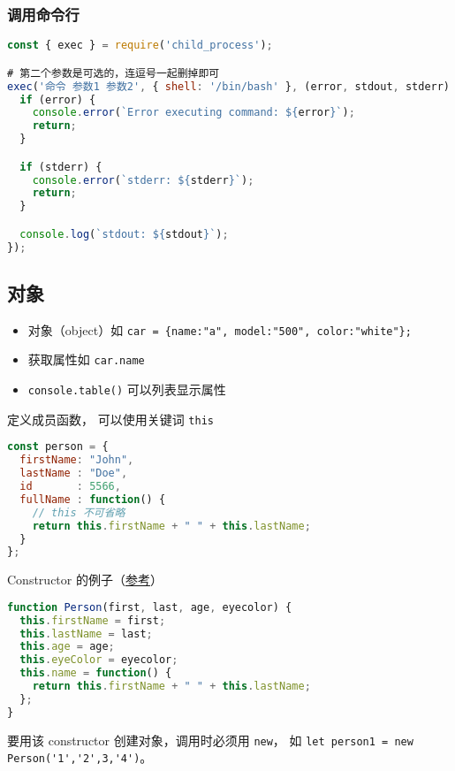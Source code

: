 \subsubsection{调用命令行}
\begin{lstlisting}[language=js]
const { exec } = require('child_process');

# 第二个参数是可选的，连逗号一起删掉即可
exec('命令 参数1 参数2', { shell: '/bin/bash' }, (error, stdout, stderr) => {
  if (error) {
    console.error(`Error executing command: ${error}`);
    return;
  }

  if (stderr) {
    console.error(`stderr: ${stderr}`);
    return;
  }

  console.log(`stdout: ${stdout}`);
});
\end{lstlisting}

\subsection{对象}
\begin{itemize}
\item 对象（object）如 \verb|car = {name:"a", model:"500", color:"white"};|
\item 获取属性如 \verb|car.name|
\item \verb|console.table()| 可以列表显示属性
\end{itemize}

定义成员函数， 可以使用关键词 \verb|this|
\begin{lstlisting}[language=js]
const person = {
  firstName: "John",
  lastName : "Doe",
  id       : 5566,
  fullName : function() {
    // this 不可省略
    return this.firstName + " " + this.lastName;
  }
};
\end{lstlisting}

Constructor 的例子（\href{https://www.w3schools.com/js/js_object_constructors.asp}{参考}）
\begin{lstlisting}[language=js]
function Person(first, last, age, eyecolor) {
  this.firstName = first;
  this.lastName = last;
  this.age = age;
  this.eyeColor = eyecolor;
  this.name = function() {
    return this.firstName + " " + this.lastName;
  };
}
\end{lstlisting}
要用该 constructor 创建对象，调用时必须用 \verb`new`， 如 \verb`let person1 = new Person('1','2',3,'4')`。

